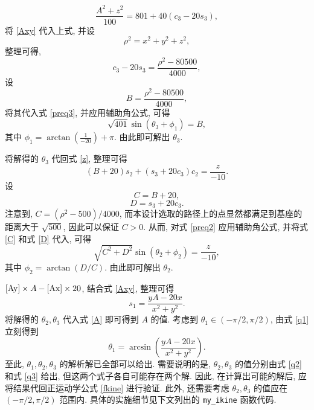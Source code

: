 \documentclass{article}
\begin{document}
\begin{equation}
    \frac{A^2+z^2}{100} = 801 + 40 (c_3 - 20s_3),
\end{equation}
将 \eqref{Axy} 代入上式, 并设
\begin{equation}
    \label{rho}
    \rho^2 = x^2 + y^2 + z^2,
\end{equation}
整理可得,
\begin{equation}
    \label{preq3}
    c_3 - 20s_3 = \frac{\rho^2 - 80500}{4000},
\end{equation}
设
\begin{equation}
    \label{B}
    B = \frac{\rho^2 - 80500}{4000},
\end{equation}
将其代入式 \eqref{preq3}, 并应用辅助角公式, 可得
\begin{equation}
    \label{q3}
    \sqrt{401}\sin(\theta_3 + \phi_1) = B,
\end{equation}
其中 $\phi_1 = \arctan(\frac{1}{-20}) + \pi$. 由此即可解出 $\theta_3$.\par
将解得的 $\theta_3$ 代回式 \eqref{z}, 整理可得
\begin{equation}
    \label{preq2}
    (B+20)s_2 + (s_3+20c_3)c_2 = \frac{z}{-10}.
\end{equation}
设
\begin{equation}
    \label{C}
    C = B + 20,
\end{equation}
\begin{equation}
    \label{D}
    D = s_3+20c_3.
\end{equation}
注意到, $C = (\rho^2 - 500)/4000$, 而本设计选取的路径上的点显然都满足到基座的距离大于 $\sqrt{500}$, 因此可以保证 $C > 0$. 从而, 对式 \eqref{preq2} 应用辅助角公式, 并将式 \eqref{C} 和式 \eqref{D} 代入, 可得
\begin{equation}
    \label{q2}
    \sqrt{C^2+D^2} \sin(\theta_2 + \phi_2) = \frac{z}{-10},
\end{equation}
其中 $\phi_2 = \arctan(D/C)$. 由此即可解出 $\theta_2$.\par
$\eqref{Ay} \times A - \eqref{Ax} \times 20$, 结合式 \eqref{Axy}, 整理可得
\begin{equation}
    \label{q1}
    s_1 = \frac{yA - 20x}{x^2+y^2}.
\end{equation}
将解得的 $\theta_2,\theta_3$ 代入式 \eqref{A} 即可得到 $A$ 的值. 考虑到 $\theta_1 \in (-\pi/2, \pi/2)$, 由式 \eqref{q1} 立刻得到
\begin{equation}
    \label{solvedq1}
    \theta_1 = \arcsin(\frac{yA - 20x}{x^2+y^2}).
\end{equation}
至此, $\theta_1,\theta_2,\theta_3$ 的解析解已全部可以给出. 需要说明的是, $\theta_2,\theta_3$ 的值分别由式 \eqref{q2} 和式 \eqref{q3} 给出, 但这两个式子各自可能存在两个解. 因此, 在计算出可能的解后, 应将结果代回正运动学公式 \eqref{fkine} 进行验证. 此外, 还需要考虑 $\theta_2,\theta_3$ 的值应在 $(-\pi/2,\pi/2)$ 范围内. 具体的实施细节见下文列出的 \verb|my_ikine| 函数代码.
\end{document}
